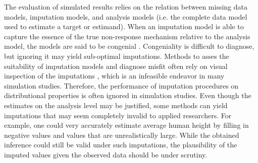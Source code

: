 \documentclass[bimj,fleqn]{w-art}
\begin{document}
The evaluation of simulated results relies on the relation between missing data models, imputation models, and analysis models (i.e. the complete data model used to estimate a target or estimand). When an imputation model is able to capture the essence of the true non-response mechanism relative to the analysis model, the models are said to be congenial \citep{meng94}. Congeniality is difficult to diagnose, but ignoring it may yield sub-optimal imputations. Methods to asses the suitability of imputation models and diagnose misfit often rely on visual inspection of the imputations \citep[see e.g.][]{abayomi2008diagnostics, bond16}, which is an infeasible endeavor in many simulation studies. %
Therefore, the performance of imputation procedures on distributional properties is often ignored in simulation studies. Even though the estimates on the analysis level may be justified, some methods can yield imputations that may seem completely invalid to applied researchers. For example, one could very accurately estimate average human height by filling in negative values and values that are unrealistically large. While the obtained inference could still be valid under such imputations, the plausibility of the imputed values given the observed data should be under scrutiny. 

\end{document}
